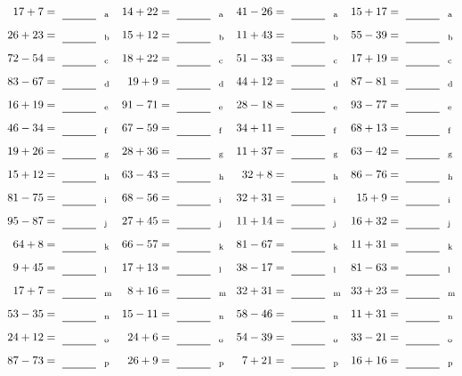 \documentclass
[
  draft    = true,
  fontsize = 11pt,
  parskip  = half-
]
{scrartcl}
\begin{document}
\clearpage
\begin{align*}
    \pline{17+7}&=\rline{a}
  & \pline{14+22}&=\rline{a}
  & \pline{41-26}&=\rline{a}
  & \pline{15+17}&=\rline{a} \\[1ex]
    \pline{26+23}&=\rline{b}
  & \pline{15+12}&=\rline{b}
  & \pline{11+43}&=\rline{b}
  & \pline{55-39}&=\rline{b} \\[1ex]
    \pline{72-54}&=\rline{c}
  & \pline{18+22}&=\rline{c}
  & \pline{51-33}&=\rline{c}
  & \pline{17+19}&=\rline{c} \\[1ex]
    \pline{83-67}&=\rline{d}
  & \pline{19+9}&=\rline{d}
  & \pline{44+12}&=\rline{d}
  & \pline{87-81}&=\rline{d} \\[1ex]
    \pline{16+19}&=\rline{e}
  & \pline{91-71}&=\rline{e}
  & \pline{28-18}&=\rline{e}
  & \pline{93-77}&=\rline{e} \\[1ex]
    \pline{46-34}&=\rline{f}
  & \pline{67-59}&=\rline{f}
  & \pline{34+11}&=\rline{f}
  & \pline{68+13}&=\rline{f} \\[1ex]
    \pline{19+26}&=\rline{g}
  & \pline{28+36}&=\rline{g}
  & \pline{11+37}&=\rline{g}
  & \pline{63-42}&=\rline{g} \\[1ex]
    \pline{15+12}&=\rline{h}
  & \pline{63-43}&=\rline{h}
  & \pline{32+8}&=\rline{h}
  & \pline{86-76}&=\rline{h} \\[1ex]
    \pline{81-75}&=\rline{i}
  & \pline{68-56}&=\rline{i}
  & \pline{32+31}&=\rline{i}
  & \pline{15+9}&=\rline{i} \\[1ex]
    \pline{95-87}&=\rline{j}
  & \pline{27+45}&=\rline{j}
  & \pline{11+14}&=\rline{j}
  & \pline{16+32}&=\rline{j} \\[1ex]
    \pline{64+8}&=\rline{k}
  & \pline{66-57}&=\rline{k}
  & \pline{81-67}&=\rline{k}
  & \pline{11+31}&=\rline{k} \\[1ex]
    \pline{9+45}&=\rline{l}
  & \pline{17+13}&=\rline{l}
  & \pline{38-17}&=\rline{l}
  & \pline{81-63}&=\rline{l} \\[1ex]
    \pline{17+7}&=\rline{m}
  & \pline{8+16}&=\rline{m}
  & \pline{32+31}&=\rline{m}
  & \pline{33+23}&=\rline{m} \\[1ex]
    \pline{53-35}&=\rline{n}
  & \pline{15-11}&=\rline{n}
  & \pline{58-46}&=\rline{n}
  & \pline{11+31}&=\rline{n} \\[1ex]
    \pline{24+12}&=\rline{o}
  & \pline{24+6}&=\rline{o}
  & \pline{54-39}&=\rline{o}
  & \pline{33-21}&=\rline{o} \\[1ex]
    \pline{87-73}&=\rline{p}
  & \pline{26+9}&=\rline{p}
  & \pline{7+21}&=\rline{p}
  & \pline{16+16}&=\rline{p}
\end{align*}
\end{document}
